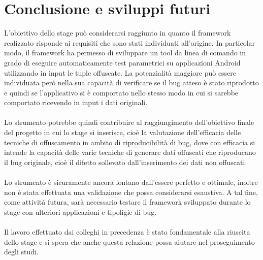 \chapter{Conclusione e sviluppi futuri}

L'obiettivo dello stage può considerarsi raggiunto in quanto il framework realizzato risponde ai requisiti che sono stati individuati all'origine. In particolar modo, il framework ha permesso di sviluppare un tool da linea di comando in grado di eseguire automaticamente test parametrici su applicazioni Android utilizzando in input le tuple offuscate. La potenzialità maggiore può essere individuata però nella sua capacità di verificare se il bug atteso è stato riprodotto e quindi se l'applicativo si è comportato nello stesso modo in cui si sarebbe comportato ricevendo in input i dati originali.
\\\\
Lo strumento potrebbe quindi contribuire al raggiungimento dell'obiettivo finale del progetto in cui lo stage si inserisce, cioè la valutazione dell'efficacia delle tecniche di offuscamento in ambito di riproducibilità di bug, dove con efficacia si intende la capacità delle varie tecniche di generare dati offuscati che riproducano il bug originale, cioè il difetto sollevato dall'inserimento dei dati non offuscati. 
\\\\
Lo strumento è sicuramente ancora lontano dall'essere perfetto e ottimale, inoltre non è stata effettuata una validazione che possa considerarsi esaustiva. A tal fine, come attività futura, sarà necessario testare il framework sviluppato durante lo stage con ulteriori applicazioni e tipoligie di bug.
\\\\
Il lavoro effettuato dai colleghi in precedenza è stato fondamentale alla riuscita dello stage e si spera che anche questa relazione possa aiutare nel proseguimento degli studi.

